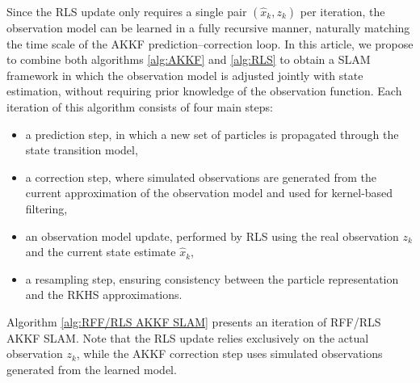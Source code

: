 \documentclass[conference]{IEEEtran}
\begin{document}
Since the RLS update only requires a single pair $(\hat{x}_k,z_k)$ per iteration, the observation model can be learned in a fully recursive manner, naturally matching the time scale of the AKKF prediction–correction loop. In this article, we propose to combine both algorithms \ref{alg:AKKF} and \ref{alg:RLS} to obtain a SLAM framework in which the observation model is adjusted jointly with state estimation, without requiring prior knowledge of the observation function. Each iteration of this algorithm consists of four main steps:
\begin{itemize}
\item a prediction step, in which a new set of particles is propagated through the state transition model,
\item a correction step, where simulated observations are generated from the current approximation of the observation model and used for kernel-based filtering,
\item an observation model update, performed by RLS using the real observation $z_k$ and the current state estimate $\hat{x}_k$,
\item a resampling step, ensuring consistency between the particle representation and the RKHS approximations.
\end{itemize}

Algorithm \ref{alg:RFF/RLS AKKF SLAM} presents an iteration of RFF/RLS AKKF SLAM. Note that the RLS update relies exclusively on the actual observation $z_k$, while the AKKF correction step uses simulated observations generated from the learned model.
\end{document}
